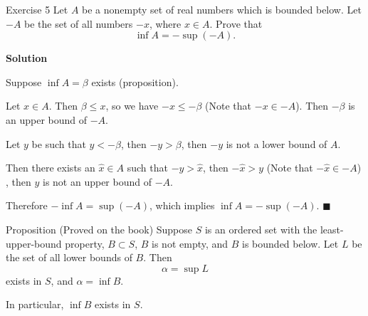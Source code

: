 \documentclass[12pt, a4paper]{article}
\begin{document}
\thispagestyle{fancy}

\begin{exercisebox}{Exercise 5}
Let $A$ be a nonempty set of real numbers which is bounded below. Let $-A$ be the set of all numbers $-x$, where $x \in A$. Prove that
\[
\inf A = -\sup(-A).
\]
\end{exercisebox}

\textbf{Solution}

Suppose $\inf A = \beta$ exists (proposition).

Let $x \in A$. Then $\beta \leq x$, so we have $-x \leq -\beta$ (Note that $-x \in -A$). Then $-\beta$ is an upper bound of $-A$.

Let $y$ be such that $y < -\beta$, then $-y > \beta$, then $-y$ is not a lower bound of $A$.

Then there exists an $\hat{x} \in A$ such that $-y > \hat{x}$, then $-\hat{x} > y$ (Note that $-\hat{x} \in -A$) , then $y$ is not an upper bound of $-A$.

Therefore $-\inf A = \sup(-A)$, which implies $\inf A = -\sup(-A)$. $\blacksquare$

\newpage

\begin{exercisebox}{Proposition (Proved on the book)}
Suppose $S$ is an ordered set with the least-upper-bound property, $B \subset S$, $B$ is not empty, and $B$ is bounded below. Let $L$ be the set of all lower bounds of $B$. Then
\[ \alpha = \sup L \]
exists in $S$, and $\alpha = \inf B$.
\par \quad In particular, $\inf B$ exists in $S$.
\end{exercisebox}
\end{document}

